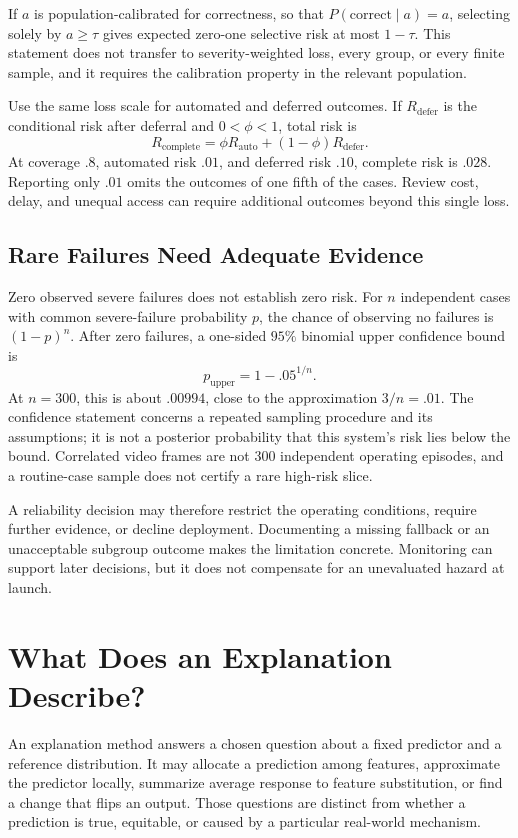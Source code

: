 If $a$ is population-calibrated for correctness, so that $P(\text{correct}\mid a)=a$, selecting solely by $a\ge\tau$ gives expected zero-one selective risk at most $1-\tau$. This statement does not transfer to severity-weighted loss, every group, or every finite sample, and it requires the calibration property in the relevant population.

Use the same loss scale for automated and deferred outcomes. If $R_{\mathrm{defer}}$ is the conditional risk after deferral and $0<\phi<1$, total risk is
\[
R_{\mathrm{complete}}=\phi R_{\mathrm{auto}}
+(1-\phi)R_{\mathrm{defer}}.
\]
At coverage $.8$, automated risk $.01$, and deferred risk $.10$, complete risk is $.028$. Reporting only $.01$ omits the outcomes of one fifth of the cases. Review cost, delay, and unequal access can require additional outcomes beyond this single loss.

\subsection{Rare Failures Need Adequate Evidence}

Zero observed severe failures does not establish zero risk. For $n$ independent cases with common severe-failure probability $p$, the chance of observing no failures is $(1-p)^n$. After zero failures, a one-sided $95\%$ binomial upper confidence bound is
\[
p_{\mathrm{upper}}=1-.05^{1/n}.
\]
At $n=300$, this is about $.00994$, close to the approximation $3/n=.01$. The confidence statement concerns a repeated sampling procedure and its assumptions; it is not a posterior probability that this system's risk lies below the bound. Correlated video frames are not $300$ independent operating episodes, and a routine-case sample does not certify a rare high-risk slice.

A reliability decision may therefore restrict the operating conditions, require further evidence, or decline deployment. Documenting a missing fallback or an unacceptable subgroup outcome makes the limitation concrete. Monitoring can support later decisions, but it does not compensate for an unevaluated hazard at launch.

\section{What Does an Explanation Describe?}
\label{sec:xai-toolkit}

An explanation method answers a chosen question about a fixed predictor and a reference distribution. It may allocate a prediction among features, approximate the predictor locally, summarize average response to feature substitution, or find a change that flips an output. Those questions are distinct from whether a prediction is true, equitable, or caused by a particular real-world mechanism.

